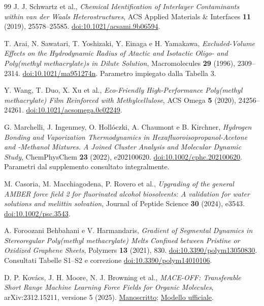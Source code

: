 \documentclass[11pt,reqno]{amsart}
\numberwithin{equation}{section}
\begin{document}
\begin{thebibliography}{99}
J. J. Schwartz et al., \emph{Chemical Identification of Interlayer
Contaminants within van der Waals Heterostructures},
ACS Applied Materials \& Interfaces \textbf{11} (2019), 25578--25585.
\href{https://doi.org/10.1021/acsami.9b06594}{doi:10.1021/acsami.9b06594}.

T. Arai, N. Sawatari, T. Yoshizaki, Y. Einaga e H. Yamakawa,
\emph{Excluded-Volume Effects on the Hydrodynamic Radius of Atactic and
Isotactic Oligo- and Poly(methyl methacrylate)s in Dilute Solution},
Macromolecules \textbf{29} (1996), 2309--2314.
\href{https://doi.org/10.1021/ma951274n}{doi:10.1021/ma951274n}.
Parametro impiegato dalla Tabella 3.

Y. Wang, T. Duo, X. Xu et al., \emph{Eco-Friendly High-Performance
Poly(methyl methacrylate) Film Reinforced with Methylcellulose},
ACS Omega \textbf{5} (2020), 24256--24261.
\href{https://doi.org/10.1021/acsomega.0c02249}{doi:10.1021/acsomega.0c02249}.

G. Marchelli, J. Ingenmey, O. Holl\'oczki, A. Chaumont e B. Kirchner,
\emph{Hydrogen Bonding and Vaporization Thermodynamics in
Hexafluoroisopropanol-Acetone and -Methanol Mixtures.
A Joined Cluster Analysis and Molecular Dynamic Study},
ChemPhysChem \textbf{23} (2022), e202100620.
\href{https://doi.org/10.1002/cphc.202100620}{doi:10.1002/cphc.202100620}.
Parametri dal supplemento consultato integralmente.

M. Casoria, M. Macchiagodena, P. Rovero et al.,
\emph{Upgrading of the general AMBER force field 2 for fluorinated
alcohol biosolvents: A validation for water solutions and melittin solvation},
Journal of Peptide Science \textbf{30} (2024), e3543.
\href{https://doi.org/10.1002/psc.3543}{doi:10.1002/psc.3543}.

A. Foroozani Behbahani e V. Harmandaris,
\emph{Gradient of Segmental Dynamics in Stereoregular Poly(methyl
methacrylate) Melts Confined between Pristine or Oxidized Graphene Sheets},
Polymers \textbf{13} (2021), 830.
\href{https://doi.org/10.3390/polym13050830}{doi:10.3390/polym13050830}.
Consultati Tabelle S1--S2 e correzione
\href{https://doi.org/10.3390/polym14010106}{doi:10.3390/polym14010106}.

D. P. Kov\'acs, J. H. Moore, N. J. Browning et al.,
\emph{MACE-OFF: Transferable Short Range Machine Learning Force Fields
for Organic Molecules}, arXiv:2312.15211, versione 5 (2025).
\href{https://arxiv.org/abs/2312.15211v5}{Manoscritto};
\href{https://github.com/ACEsuit/mace-off}{Modello ufficiale}.


\end{thebibliography}
\end{document}
